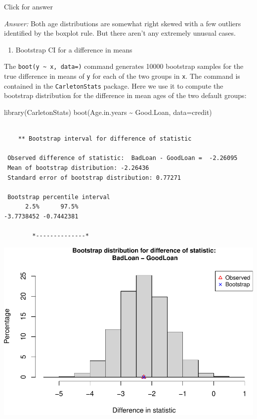 \documentclass[
]{book}
\newenvironment{Shaded}{\begin{snugshade}}{\end{snugshade}}
\newcommand{\AttributeTok}[1]{\textcolor[rgb]{0.77,0.63,0.00}{#1}}
\newcommand{\FunctionTok}[1]{\textcolor[rgb]{0.00,0.00,0.00}{#1}}
\newcommand{\NormalTok}[1]{#1}
\newcommand{\SpecialCharTok}[1]{\textcolor[rgb]{0.00,0.00,0.00}{#1}}
\providecommand{\tightlist}{%
  \setlength{\itemsep}{0pt}\setlength{\parskip}{0pt}}
\begin{document}
Click for answer

\emph{Answer:} Both age distributions are somewhat right skewed with a few outliers identified by the boxplot rule. But there aren't any extremely unusual cases.

\begin{enumerate}
\def\labelenumi{(\alph{enumi})}
\setcounter{enumi}{1}
\tightlist
\item
  Bootstrap CI for a difference in means
\end{enumerate}

The \texttt{boot(y\ \textasciitilde{}\ x,\ data=)} command generates 10000 bootstrap samples for the true difference in means of \texttt{y} for each of the two groups in \texttt{x}. The command is contained in the \texttt{CarletonStats} package. Here we use it to compute the bootstrap distribution for the difference in mean ages of the two default groups:

\begin{Shaded}
\begin{Highlighting}[]
\FunctionTok{library}\NormalTok{(CarletonStats)}
\FunctionTok{boot}\NormalTok{(Age.in.years }\SpecialCharTok{\textasciitilde{}}\NormalTok{ Good.Loan, }\AttributeTok{data=}\NormalTok{credit)}
\end{Highlighting}
\end{Shaded}

\begin{verbatim}

    ** Bootstrap interval for difference of statistic

 Observed difference of statistic:  BadLoan - GoodLoan =  -2.26095 
 Mean of bootstrap distribution: -2.26436 
 Standard error of bootstrap distribution: 0.77271 

 Bootstrap percentile interval
      2.5%      97.5% 
-3.7738452 -0.7442381 

        *--------------*
\end{verbatim}

\includegraphics[width=1\linewidth]{Class_Activity_8_files/figure-latex/unnamed-chunk-10-1}
\end{document}
